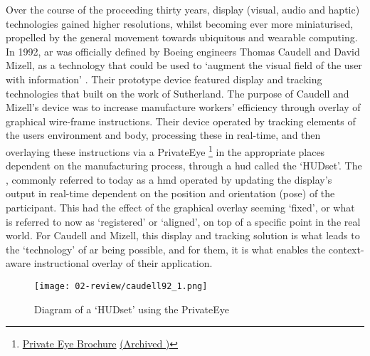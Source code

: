 Over the course of the proceeding thirty years, display (visual, audio and haptic) technologies gained higher resolutions, whilst becoming ever more miniaturised, propelled by the general movement towards ubiquitous and wearable computing. In 1992, \gls{ar} was officially defined by Boeing engineers Thomas Caudell and David Mizell, as a technology that could be used to `augment the visual field of the user with information' \citeyearpar{caudell1992}. Their prototype device featured display and tracking technologies that built on the work of Sutherland. The purpose of Caudell and Mizell's device was to increase manufacture workers' efficiency through overlay of graphical wire-frame instructions. Their device operated by tracking elements of the users environment and body, processing these in real-time, and then overlaying these instructions via a PrivateEye \footnote{\href{https://billbuxton.com/Private_Eye_Brochure.pdf}{Private Eye Brochure} \href{https://web.archive.org/web/20221226033457/https://billbuxton.com/Private_Eye_Brochure.pdf}{(Archived \faArchive)}} in the appropriate places dependent on the manufacturing process, through a \gls{hud} called the `HUDset'. The , commonly referred to today as a \gls{hmd} operated by updating the display's output in real-time dependent on the position and orientation (pose) of the participant. This had the effect of the graphical overlay seeming `fixed', or what is referred to now as `registered' or `aligned', on top of a specific point in the real world. For Caudell and Mizell, this display and tracking solution is what leads to the `technology' of \gls{ar} being possible, and for them, it is what enables the context-aware instructional overlay of their application.

\begin{figure}[H]
    \centering
    \texttt{[image: 02-review/caudell92\_1.png]}
    \captionsetup{justification=centering,margin=1.5cm}
    \caption{Diagram of a `HUDset' using the PrivateEye \citep[in][]{caudell1992}}\label{fig: caudellprivateeye}
\end{figure}

